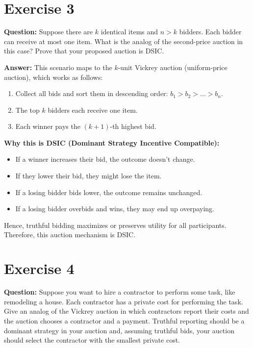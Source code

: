 \documentclass[12pt]{article}
\begin{document}
\section*{Exercise 3}

\textbf{Question:} Suppose there are $k$ identical items and $n > k$ bidders. Each bidder can receive at most one item. What is the analog of the second-price auction in this case? Prove that your proposed auction is DSIC.

\textbf{Answer:} This scenario maps to the $k$-unit Vickrey auction (uniform-price auction), which works as follows:

\begin{enumerate}[label=\arabic*.]
  \item Collect all bids and sort them in descending order: $b_1 > b_2 > \ldots > b_n$.
  \item The top $k$ bidders each receive one item.
  \item Each winner pays the $(k+1)$-th highest bid.
\end{enumerate}

\textbf{Why this is DSIC (Dominant Strategy Incentive Compatible):}
\begin{itemize}
  \item If a winner increases their bid, the outcome doesn't change.
  \item If they lower their bid, they might lose the item.
  \item If a losing bidder bids lower, the outcome remains unchanged.
  \item If a losing bidder overbids and wins, they may end up overpaying.
\end{itemize}

Hence, truthful bidding maximizes or preserves utility for all participants. Therefore, this auction mechanism is DSIC.

\section*{Exercise 4}

\textbf{Question:} Suppose you want to hire a contractor to perform some task, like remodeling a house. Each contractor has a private cost for performing the task. Give an analog of the Vickrey auction in which contractors report their costs and the auction chooses a contractor and a payment. Truthful reporting should be a dominant strategy in your auction and, assuming truthful bids, your auction should select the contractor with the smallest private cost.
\end{document}
